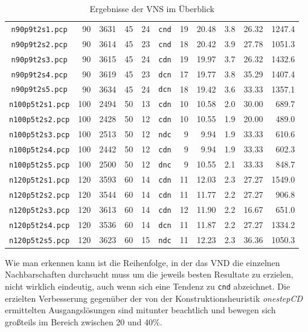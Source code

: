 \documentclass[paper=a4,fontsize=12pt]{scrartcl}
\begin{document}
\begin{table}
\begin{tabular}{c|rrr|r|c|rrr|r|r}
\texttt{n90p9t2s1.pcp} & 90	& 3631	& 45	& 24 & \texttt{cnd} & 19 & 20.48 & 3.8 & 26.32 & 1247.4\\
\texttt{n90p9t2s2.pcp} & 90	& 3614	& 45	& 23 & \texttt{cnd} & 18 & 20.42 & 3.9 & 27.78 & 1051.3\\
\texttt{n90p9t2s3.pcp} & 90	& 3615	& 45	& 24 & \texttt{cdn} & 19 & 19.97 & 3.7 & 26.32 & 1432.6\\
\texttt{n90p9t2s4.pcp} & 90	& 3619	& 45	& 23 & \texttt{dcn} & 17 & 19.77 & 3.8 & 35.29 & 1407.4\\
\texttt{n90p9t2s5.pcp} & 90	& 3634	& 45	& 24 & \texttt{dcn} & 18 & 19.42 & 3.6 & 33.33 & 1357.1\\
\texttt{n100p5t2s1.pcp} & 100	& 2494	& 50	& 13 & \texttt{cdn} & 10 & 10.58 & 2.0 & 30.00 & 689.7\\
\texttt{n100p5t2s2.pcp} & 100	& 2428	& 50	& 12 & \texttt{cdn} & 10 & 10.55 & 1.9 & 20.00 & 489.0\\
\texttt{n100p5t2s3.pcp} & 100	& 2513	& 50	& 12 & \texttt{ndc} & 9 & 9.94 & 1.9 & 33.33 & 610.6\\
\texttt{n100p5t2s4.pcp} & 100	& 2442	& 50	& 12 & \texttt{cdn} & 9 & 9.94 & 1.9 & 33.33 & 602.3\\
\texttt{n100p5t2s5.pcp} & 100	& 2500	& 50	& 12 & \texttt{dnc} & 9 & 10.55 & 2.1 & 33.33 & 848.7\\
\texttt{n120p5t2s1.pcp} & 120	& 3593	& 60	& 14 & \texttt{cdn} & 11 & 12.03 & 2.3 & 27.27 & 1549.0\\
\texttt{n120p5t2s2.pcp} & 120	& 3544	& 60	& 14 & \texttt{cdn} & 11 & 11.77 & 2.2 & 27.27 & 906.8\\
\texttt{n120p5t2s3.pcp} & 120	& 3613	& 60	& 14 & \texttt{cdn} & 12 & 11.90 & 2.2 & 16.67 & 651.0\\
\texttt{n120p5t2s4.pcp} & 120	& 3536	& 60	& 14 & \texttt{dcn} & 11 & 11.87 & 2.2 & 27.27 & 1334.2\\
\texttt{n120p5t2s5.pcp} & 120	& 3623	& 60	& 15 & \texttt{ndc} & 11 & 12.23 & 2.3 & 36.36 & 1050.3\\
\end{tabular}
\caption{Ergebnisse der VNS im Überblick}
\label{tab:result}
\end{table}

Wie man erkennen kann ist die Reihenfolge, in der das VND die einzelnen Nachbarschaften durchsucht muss um die jeweils besten Resultate zu erzielen, nicht wirklich eindeutig, auch wenn sich eine Tendenz zu \texttt{cnd} abzeichnet. Die erzielten Verbesserung gegenüber der von der Konstruktionsheuristik \emph{onestepCD} ermittelten Ausgangslösungen sind mitunter beachtlich und bewegen sich großteils im Bereich zwischen 20 und 40\%.
\end{document}
